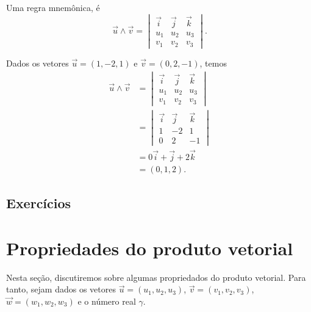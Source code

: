 \begin{obs}
  Uma regra mnemônica, é
  \begin{equation}
    \vec{u}\land\vec{v} =
    \begin{vmatrix}
      \vec{i} & \vec{j} & \vec{k} \\
      u_1 & u_2 & u_3 \\
      v_1 & v_2 & v_3
    \end{vmatrix}.
  \end{equation}
\end{obs}

\begin{ex}
  Dados os vetores $\vec{u} = (1,-2,1)$ e $\vec{v} = (0,2,-1)$, temos
  \begin{align}
    \vec{u}\land\vec{v} &=
                          \begin{vmatrix}
                            \vec{i} & \vec{j} & \vec{k} \\
                            u_1 & u_2 & u_3 \\
                            v_1 & v_2 & v_3
                          \end{vmatrix} \\
                        &=
                          \begin{vmatrix}
                            \vec{i} & \vec{j} & \vec{k} \\
                            1       & -2      & 1 \\
                            0       & 2       & -1
                          \end{vmatrix} \\
                        &= 0\vec{i} + \vec{j} + 2\vec{k}\\
                        &= (0,1,2).
  \end{align}
\end{ex}

\subsection{Exercícios}

\emconstrucao

\section{Propriedades do produto vetorial}\label{cap_prodvec_sec_prop}

Nesta seção, discutiremos sobre algumas propriedados do produto vetorial. Para tanto, sejam dados os vetores $\vec{u} = (u_1,u_2,u_3)$, $\vec{v}=(v_1,v_2,v_3)$, $\vec{w}=(w_1,w_2,w_3)$ e o número real $\gamma$.

